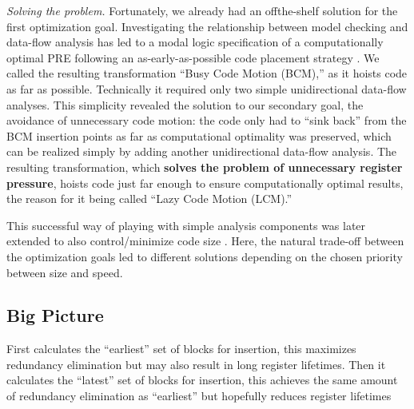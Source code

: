 \textit{Solving the problem.} Fortunately, we already had an offthe-shelf solution for the first optimization goal. Investigating the relationship between model checking and data-flow
analysis has led to a modal logic specification of a computationally optimal PRE following an as-early-as-possible code
placement strategy \cite{steffen1991data}. We called the resulting transformation “Busy Code Motion (BCM),” as it hoists code as
far as possible. Technically it required only two simple unidirectional data-flow analyses. This simplicity revealed the
solution to our secondary goal, the avoidance of unnecessary code motion: the code only had to “sink back” from
the BCM insertion points as far as computational optimality was preserved, which can be realized simply by adding another 
unidirectional data-flow analysis. The resulting transformation, which \textbf{solves the problem of unnecessary register
pressure}, hoists code just far enough to ensure computationally optimal results, the reason for it being called “Lazy
Code Motion (LCM).”

This successful way of playing with simple analysis components was later extended to also control/minimize code
size \cite{ruthing2000sparse}. Here, the natural trade-off between the optimization goals led to different solutions depending on the chosen
priority between size and speed.


\subsection{Big Picture}

First calculates the “earliest” set of blocks for insertion, this maximizes redundancy elimination but may also result in long register lifetimes.
Then it calculates the “latest” set of blocks for insertion, this achieves the same amount of redundancy elimination as “earliest” but hopefully reduces register lifetimes


\subsection{}




